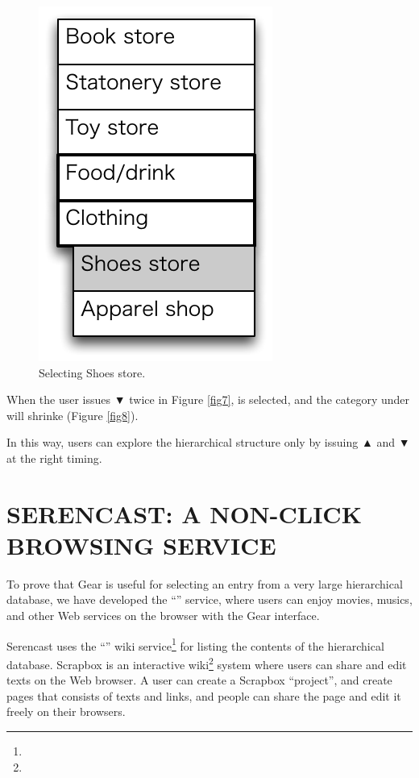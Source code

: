 \documentclass{article}
\def\up{▲}
\def\down{▼}
\def\SC{\textsf{\small Serencast}}
\def\SB{\textsf{\small Scrapbox}}
\begin{document}
\begin{figure}[H]
\centerline{\includegraphics[width=\menuwidth,bb=0 0 139 211]{figures/fig9.pdf}}
\caption{Selecting Shoes store.}
\label{fig9}
\end{figure}

When the user issues {\down} twice in Figure \ref{fig7},
 is selected, and the category under  will shrinke (Figure \ref{fig8}).

In this way, users can explore the hierarchical structure
only by issuing {\up} and {\down} at the right timing.

\section{SERENCAST: A NON-CLICK BROWSING SERVICE}


To prove that Gear is useful for selecting an entry from a very
large hierarchical database,
we have developed the ``'' service, where
users can enjoy movies, musics, and other Web services
on the browser with the Gear interface.

{\SC} uses the ``'' wiki service\footnote{
} for listing the contents of the hierarchical database.
{\SB} is an interactive wiki\footnote{
} system where users can share and edit texts on the Web browser.
A user can create a {\SB} ``project'', and create pages
that consists of texts and links,
and people can share the page and edit it freely on their browsers.
\end{document}
